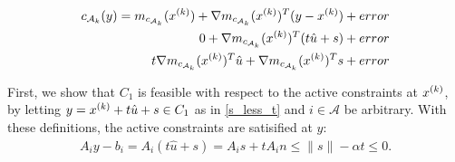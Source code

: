 \begin{align*}
c_{\mathcal A_k} (y) = m_{c_{\mathcal A_k}}({x^{(k)}}) + \nabla m_{c_{\mathcal A_k}}({x^{(k)}})^T(y - {x^{(k)}}) + error \\
0 + \nabla m_{c_{\mathcal A_k}}({x^{(k)}})^T(t\hat u + s) + error \\
t \nabla m_{c_{\mathcal A_k}}({x^{(k)}})^T\hat u + \nabla m_{c_{\mathcal A_k}}({x^{(k)}})^Ts + error \\
\end{align*}


First, we show that $C_1$ is feasible with respect to the active constraints at ${x^{(k)}}$,
by letting $y = {x^{(k)}} + t\hat u + s\in C_1$ as in \ref{s_less_t} and $i \in \mathcal A$ be arbitrary.
With these definitions, the active constraints are satisified at $y$:
\begin{align*}
A_{i}y - b_{i} = A_{i}(t\hat u + s) = A_{i}s + t A_{i}n \le \|s\| - \alpha t \le 0.
\end{align*}


